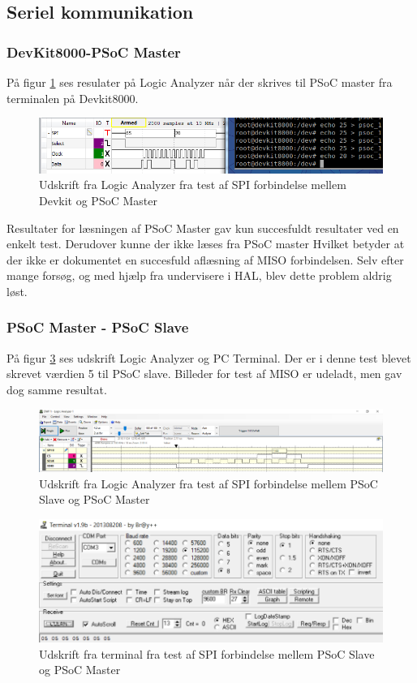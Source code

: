 \subsection{Seriel kommunikation}

\subsubsection{DevKit8000-PSoC Master}
På figur \ref{LA_SPI_1} ses resulater på Logic Analyzer når der skrives til PSoC master fra terminalen på Devkit8000.

\begin{figure}[H]
	\includegraphics[scale=0.6]{tex/TeImRe/SPI/Analog_devkit_echo_psoc_1}
	\caption{Udskrift fra Logic Analyzer fra test af SPI forbindelse mellem Devkit og PSoC Master}
	\label{LA_SPI_1}
\end{figure}

Resultater for læsningen af PSoC Master gav kun succesfuldt resultater ved en enkelt test. Derudover kunne der ikke læses fra PSoC master
Hvilket betyder at der ikke er dokumentet en succesfuld aflæsning af MISO forbindelsen. Selv efter mange forsøg, og med hjælp fra undervisere i HAL, blev 
dette problem aldrig løst.

\subsubsection{PSoC Master - PSoC Slave}
På figur \ref{LA_SPI_3} ses udskrift Logic Analyzer og PC Terminal. Der er i denne test blevet skrevet værdien 5 til PSoC slave. Billeder for test af MISO er udeladt, men
gav dog samme resultat.

\begin{figure}[H]
	\includegraphics[scale=0.2]{tex/TeImRe/SPI/Logic_analyzer}
	\caption{Udskrift fra Logic Analyzer fra test af SPI forbindelse mellem PSoC Slave og PSoC Master}
	\label{LA_SPI_2}
\end{figure}

\begin{figure}[H]
	\includegraphics[scale=0.4]{tex/TeImRe/SPI/Terminal_spi_slave}
	\caption{Udskrift fra terminal fra test af SPI forbindelse mellem PSoC Slave og PSoC Master}
	\label{LA_SPI_3}
\end{figure}